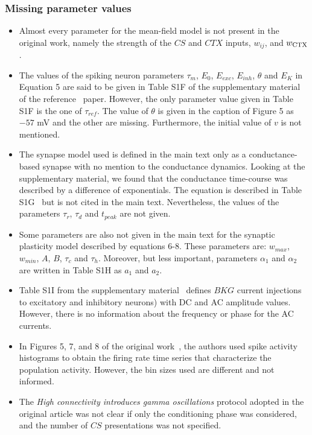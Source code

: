 \subsubsection*{Missing parameter values}
\begin{itemize}

    \item Almost every parameter for the mean-field model is not present in the original work, namely the strength of the $CS$ and $CTX$ inputs, $w_{ij}$, and $w_{\rm CTX}$.
    
    \item The values of the spiking neuron parameters $\tau_m$, $E_0$, $E_{exc}$, $E_{inh}$, $\theta$ and $E_K$ in Equation 5 are said to be given in Table S1F of the supplementary material of the reference~\cite{Vlachos2011} paper. However, the only parameter value given in Table S1F is the one of $\tau_{ref}$. The value of $\theta$ is given in the caption of Figure 5 as $-57$ mV and the other are missing. Furthermore, the initial value of $v$ is not mentioned.
    
    \item The synapse model used is defined in the main text only as a conductance-based synapse with no mention to the conductance dynamics. Looking at the supplementary material, we found that the conductance time-course was described by a difference of exponentials. The equation is described in Table S1G~\cite{Vlachos2011} but is not cited in the main text. Nevertheless, the values of the parameters $\tau_r$, $\tau_d$ and $t_{peak}$ are not given.
    
    \item Some parameters are also not given in the main text for the synaptic plasticity model described by equations 6-8. These parameters are: $w_{max}$, $w_{min}$, $A$, $B$, $\tau_c$ and $\tau_h$.
    Moreover, but less important, parameters $\alpha_1$ and $\alpha_2$ are written in Table S1H as $a_1$ and $a_2$.
    
    \item Table S1I from the supplementary material~\cite{Vlachos2011} defines $BKG$ current injections to excitatory and inhibitory neurons) with DC and AC amplitude values. However, there is no information about the frequency or phase for the AC currents. 
    
    \item In Figures 5, 7, and 8 of the original work~\cite{Vlachos2011}, the authors used spike activity histograms to obtain the firing rate time series that characterize the population activity. However, the bin sizes used are different and not informed.
   
   \item The \textit{High connectivity introduces gamma oscillations} protocol adopted in the original article was not clear if only the conditioning phase was considered, and the number of $CS$ presentations was not specified.
    
\end{itemize}


